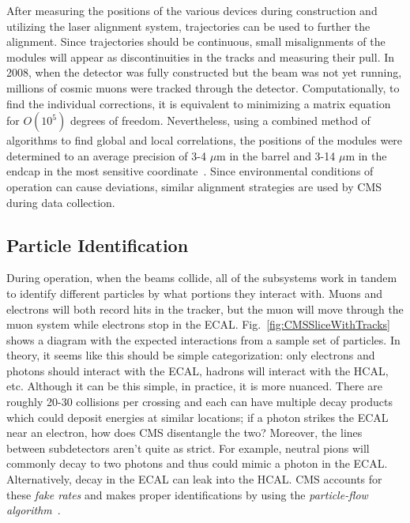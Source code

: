 After measuring the positions of the various devices during construction and utilizing the laser alignment system, trajectories can be used to further the alignment. Since trajectories should be continuous, small misalignments of the modules will appear as discontinuities in the tracks and measuring their pull. In 2008, when the detector was fully constructed but the beam was not yet running, millions of cosmic muons were tracked through the detector. Computationally, to find the individual corrections, it is equivalent to minimizing a matrix equation for $O(10^5)$ degrees of freedom. Nevertheless, using a combined method of algorithms to find global and local correlations, the positions of the modules were determined to an average precision of 3-4 $\mu$m in the barrel and 3-14 $\mu$m in the endcap in the most sensitive coordinate~\cite{}. Since environmental conditions of operation can cause deviations, similar alignment strategies are used by CMS during data collection.

\subsection{Particle Identification}
\label{sec:ParticleID}

During operation, when the beams collide, all of the subsystems work in tandem to identify different particles by what portions they interact with. Muons and electrons will both record hits in the tracker, but the muon will move through the muon system while electrons stop in the ECAL. Fig.~\ref{fig:CMSSliceWithTracks} shows a diagram with the expected interactions from a sample set of particles. In theory, it seems like this should be simple categorization: only electrons and photons should interact with the ECAL, hadrons will interact with the HCAL, etc. Although it can be this simple, in practice, it is more nuanced. There are roughly 20-30 collisions per crossing and each can have multiple decay products which could deposit energies at similar locations; if a photon strikes the ECAL near an electron, how does CMS disentangle the two? Moreover, the lines between subdetectors aren't quite as strict. For example, neutral pions will commonly decay to two photons and thus could mimic a photon in the ECAL. Alternatively, decay in the ECAL can leak into the HCAL. CMS accounts for these \textit{fake rates} and makes proper identifications by using the \textit{particle-flow algorithm}~\cite{}. 

